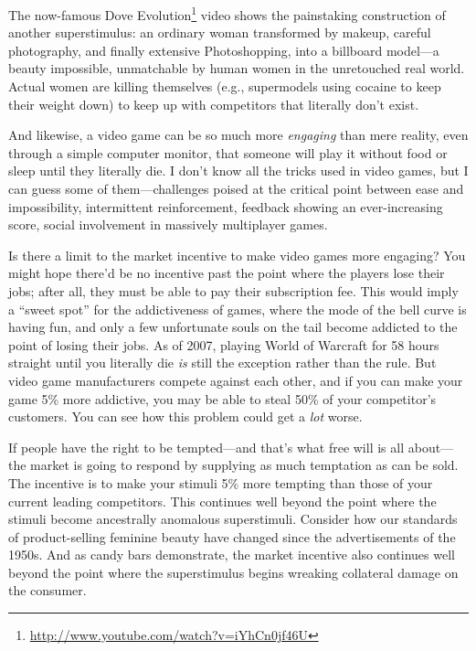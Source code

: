 {
 The now-famous Dove Evolution\footnote{\url{http://www.youtube.com/watch?v=iYhCn0jf46U}} video shows the painstaking
construction of another superstimulus: an ordinary woman transformed by
makeup, careful photography, and finally extensive Photoshopping, into
a billboard model---a beauty impossible, unmatchable by human women in
the unretouched real world. Actual women are killing themselves (e.g.,
supermodels using cocaine to keep their weight down) to keep up with
competitors that literally don't exist.}

{
 And likewise, a video game can be so much more \textit{engaging}
than mere reality, even through a simple computer monitor, that someone
will play it without food or sleep until they literally die. I
don't know all the tricks used in video games, but I
can guess some of them---challenges poised at the critical point
between ease and impossibility, intermittent reinforcement, feedback
showing an ever-increasing score, social involvement in massively
multiplayer games.}

{
 Is there a limit to the market incentive to make video games more
engaging? You might hope there'd be no incentive past
the point where the players lose their jobs; after all, they must be
able to pay their subscription fee. This would imply a
``sweet spot'' for the addictiveness
of games, where the mode of the bell curve is having fun, and only a
few unfortunate souls on the tail become addicted to the point of
losing their jobs. As of 2007, playing World of Warcraft for 58 hours
straight until you literally die \textit{is} still the exception rather
than the rule. But video game manufacturers compete against each other,
and if you can make your game 5\% more addictive, you may be able to
steal 50\% of your competitor's customers. You can see
how this problem could get a \textit{lot} worse.}

{
 If people have the right to be tempted---and
that's what free will is all about---the market is
going to respond by supplying as much temptation as can be sold. The
incentive is to make your stimuli 5\% more tempting than those of your
current leading competitors. This continues well beyond the point where
the stimuli become ancestrally anomalous superstimuli. Consider how our
standards of product-selling feminine beauty have changed since the
advertisements of the 1950s. And as candy bars demonstrate, the market
incentive also continues well beyond the point where the superstimulus
begins wreaking collateral damage on the consumer.}


